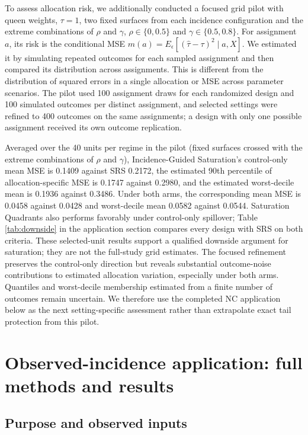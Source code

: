 \documentclass[11pt]{article}
\begin{document}
To assess allocation risk, we additionally conducted a focused grid
pilot with queen weights, \(\tau=1\), two fixed surfaces from each incidence configuration and the extreme combinations of $\rho$ and $\gamma$, $\rho\in\{0,0.5\}$ and $\gamma\in\{0.5,0.8\}$. For assignment $a$, its risk is the conditional MSE $m(a)=E_\epsilon[(\hat\tau-\tau)^2\mid a,X]$. We estimated it by simulating repeated outcomes for each sampled assignment and then compared its distribution across assignments. This is different from the distribution
of squared errors in a single allocation or MSE across parameter
scenarios. The pilot used 100 assignment draws for each randomized design and 100 simulated outcomes per distinct assignment, and selected settings were refined to 400 outcomes on the same assignments; a design with only one possible assignment received its own outcome replication.

Averaged over the 40 units per regime in the pilot (fixed surfaces crossed with the extreme combinations of $\rho$ and $\gamma$), Incidence-Guided Saturation's control-only mean MSE is 0.1409 against SRS 0.2172, the estimated 90th percentile of allocation-specific MSE is 0.1747 against 0.2980, and the estimated worst-decile mean is 0.1936 against 0.3486. Under both arms, the
corresponding mean MSE is 0.0458 against 0.0428 and worst-decile mean
0.0582 against 0.0544. Saturation Quadrants also performs favorably under
control-only spillover; Table \ref{tab:downside} in the application section compares every design with SRS on both criteria. These selected-unit results support a qualified
downside argument for saturation; they are not the full-study grid
estimates. The focused refinement preserves the control-only direction
but reveals substantial outcome-noise contributions to estimated
allocation variation, especially under both arms. Quantiles and worst-decile membership estimated from a finite number of outcomes remain uncertain. We therefore use
the completed NC application below as the next setting-specific
assessment rather than extrapolate exact tail protection from this
pilot.

\section{Observed-incidence application: full methods and
results}\label{observed-incidence-application-full-methods-and-results}

\subsection{Purpose and observed
inputs}\label{purpose-and-observed-inputs}
\end{document}
